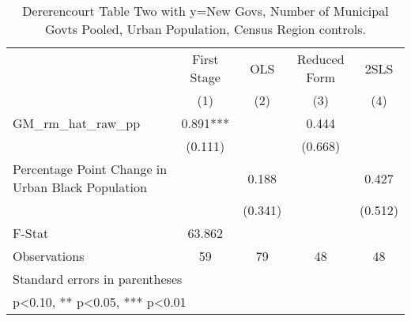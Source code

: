 \begin{table}[htbp]\centering
\def\sym#1{\ifmmode^{#1}\else\(^{#1}\)\fi}
\caption{Dererencourt Table Two with y=New Govs, Number of Municipal Govts  Pooled, Urban Population, Census Region controls.}
\begin{tabular}{l*{4}{c}}
\toprule
                    & First Stage   &         OLS   &Reduced Form   &        2SLS   \\
                    &\multicolumn{1}{c}{(1)}   &\multicolumn{1}{c}{(2)}   &\multicolumn{1}{c}{(3)}   &\multicolumn{1}{c}{(4)}   \\
\midrule
GM\_rm\_hat\_raw\_pp    &       0.891***&               &       0.444   &               \\
                    &     (0.111)   &               &     (0.668)   &               \\
\addlinespace
Percentage Point Change in Urban Black Population&               &       0.188   &               &       0.427   \\
                    &               &     (0.341)   &               &     (0.512)   \\
\midrule
F-Stat              &      63.862   &               &               &               \\
Observations        &          59   &          79   &          48   &          48   \\
\bottomrule
\multicolumn{5}{l}{\footnotesize Standard errors in parentheses}\\
\multicolumn{5}{l}{\footnotesize * p<0.10, ** p<0.05, *** p<0.01}\\
\end{tabular}
\end{table}
